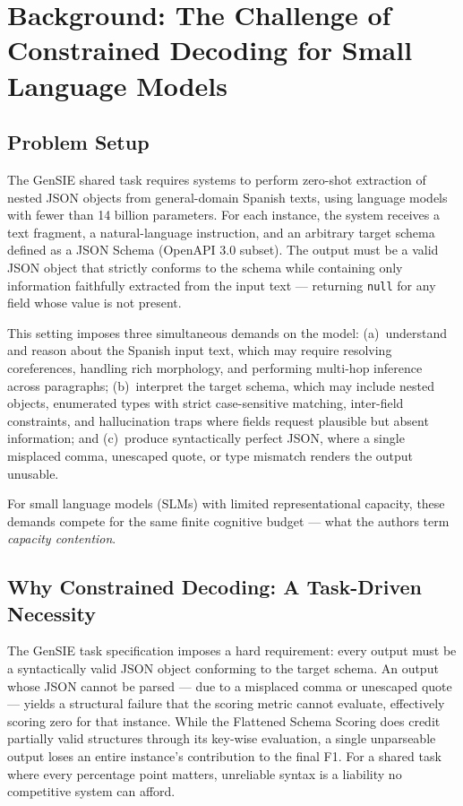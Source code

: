 \documentclass{ceurart}
\begin{document}
\section{Background: The Challenge of Constrained Decoding for Small Language Models}
\label{sec:background}

\subsection{Problem Setup}

The GenSIE shared task requires systems to perform zero-shot extraction of nested
JSON objects from general-domain Spanish texts, using language models with fewer
than 14 billion parameters.
For each instance, the system receives a text fragment, a natural-language instruction,
and an arbitrary target schema defined as a JSON Schema (OpenAPI 3.0 subset).
The output must be a valid JSON object that strictly conforms to the schema while
containing only information faithfully extracted from the input text --- returning
\texttt{null} for any field whose value is not present.

This setting imposes three simultaneous demands on the model:
(a)~understand and reason about the Spanish input text, which may require resolving
coreferences, handling rich morphology, and performing multi-hop inference across
paragraphs;
(b)~interpret the target schema, which may include nested objects, enumerated types
with strict case-sensitive matching, inter-field constraints, and hallucination traps
where fields request plausible but absent information; and
(c)~produce syntactically perfect JSON, where a single misplaced comma, unescaped
quote, or type mismatch renders the output unusable.

For small language models (SLMs) with limited representational capacity, these demands
compete for the same finite cognitive budget --- what the authors term
\emph{capacity contention}.

\subsection{Why Constrained Decoding: A Task-Driven Necessity}

The GenSIE task specification imposes a hard requirement: every output must be a
syntactically valid JSON object conforming to the target schema.
An output whose JSON cannot be parsed --- due to a misplaced comma or unescaped quote
--- yields a structural failure that the scoring metric cannot evaluate, effectively
scoring zero for that instance.
While the Flattened Schema Scoring does credit partially valid structures through its
key-wise evaluation, a single unparseable output loses an entire instance's
contribution to the final F1.
For a shared task where every percentage point matters, unreliable syntax is a
liability no competitive system can afford.
\end{document}

